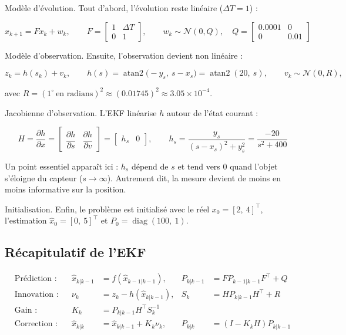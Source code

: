 \documentclass[11pt]{article}
\theoremstyle{remark}
\theoremstyle{definition}
\begin{document}
Modèle d'évolution. Tout d'abord, l'évolution reste linéaire ($\Delta T = 1$) :

\begin{equation}
x_{k+1} = F x_k + w_k,
\qquad
F = \begin{bmatrix} 1 & \Delta T \\ 0 & 1 \end{bmatrix},
\qquad
w_k \sim \mathcal{N}(0, Q),
\quad
Q = \begin{bmatrix} 0.0001 & 0 \\ 0 & 0.01 \end{bmatrix}
\end{equation}

Modèle d'observation. Ensuite, l'observation devient non linéaire :

\begin{equation}
z_k = h(s_k) + v_k,
\qquad
h(s) = \operatorname{atan2}\!\big(-y_s,\ s - x_s\big) = \operatorname{atan2}(20,\ s),
\qquad
v_k \sim \mathcal{N}(0, R),
\end{equation}

avec $R = (1^\circ\ \text{en radians})^2 \approx (0.01745)^2 \approx 3.05\times 10^{-4}$.

Jacobienne d'observation. L'EKF linéarise $h$ autour de l'état courant :

\begin{equation}
H = \frac{\partial h}{\partial x} =
\begin{bmatrix} \dfrac{\partial h}{\partial s} & \dfrac{\partial h}{\partial v} \end{bmatrix}
=
\begin{bmatrix} h_s & 0 \end{bmatrix},
\qquad
h_s = \frac{y_s}{(s - x_s)^2 + y_s^2} = \frac{-20}{s^2 + 400}
\end{equation}

Un point essentiel apparaît ici : $h_s$ dépend de $s$ et tend vers $0$ quand l'objet
s'éloigne du capteur ($s \to \infty$). Autrement dit, la mesure devient de moins en moins
informative sur la position.

Initialisation. Enfin, le problème est initialisé avec le réel $x_0 = [2,\ 4]^\top$,
l'estimation $\hat{x}_0 = [0,\ 5]^\top$ et $P_0 = \operatorname{diag}(100,\ 1)$.

\subsection{Récapitulatif de l'EKF}

\begin{equation}
\begin{aligned}
\text{Prédiction :}&& \hat{x}_{k|k-1} &= f(\hat{x}_{k-1|k-1}), & P_{k|k-1} &= F P_{k-1|k-1} F^\top + Q \\[2pt]
\text{Innovation :}&& \nu_k &= z_k - h(\hat{x}_{k|k-1}), & S_k &= H P_{k|k-1} H^\top + R \\[2pt]
\text{Gain :}&& K_k &= P_{k|k-1} H^\top S_k^{-1} \\[2pt]
\text{Correction :}&& \hat{x}_{k|k} &= \hat{x}_{k|k-1} + K_k \nu_k, & P_{k|k} &= (I - K_k H) P_{k|k-1}
\end{aligned}
\end{equation}
\end{document}
